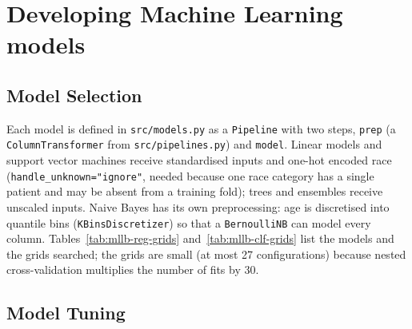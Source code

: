 \section{Developing Machine Learning models}

\subsection{Model Selection}

Each model is defined in \texttt{src/models.py} as a \texttt{Pipeline} with two steps,
\texttt{prep} (a \texttt{Column\allowbreak{}Transformer} from \texttt{src/\allowbreak{}pipelines.\allowbreak{}py}) and \texttt{model}.
Linear models and support vector machines receive standardised inputs and one-hot encoded race
(\texttt{handle\_\allowbreak{}unknown="ignore"}, needed because one race category has a single patient and may be
absent from a training fold); trees and ensembles receive unscaled inputs. Naive Bayes has its own
preprocessing: age is discretised into quantile bins (\texttt{KBinsDiscretizer}) so that a
\texttt{BernoulliNB} can model every column. Tables~\ref{tab:mllb-reg-grids} and~\ref{tab:mllb-clf-grids}
list the models and the grids searched; the grids are small (at most 27 configurations) because
nested cross-validation multiplies the number of fits by 30.

\begin{table}[H]
\centering
\caption{Regression models and hyperparameter grids.}
\label{tab:mllb-reg-grids}
\resizebox{\textwidth}{!}{}
\end{table}

\begin{table}[H]
\centering
\caption{Classification models and hyperparameter grids (the SVM grid is a list of two sub-grids,
linear and RBF).}
\label{tab:mllb-clf-grids}
\resizebox{\textwidth}{!}{}
\end{table}

\subsection{Model Tuning}

